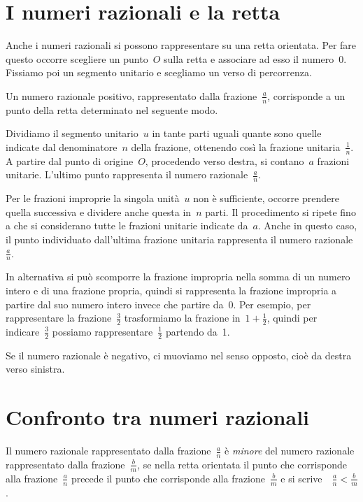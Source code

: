 \section{I numeri razionali e la retta}

Anche i numeri razionali si possono rappresentare su una retta orientata. Per fare questo occorre
scegliere un punto~$O$ sulla retta e associare ad esso il numero~0. Fissiamo poi un segmento unitario e scegliamo
un verso di percorrenza.

Un numero razionale positivo, rappresentato dalla frazione~$\frac{a}{n}$, corrisponde a un punto della retta determinato nel seguente modo.

Dividiamo il segmento unitario~$u$ in tante parti uguali
quante sono quelle indicate dal denominatore~$n$ della frazione, ottenendo così la frazione unitaria~$\frac{1}{n}$.
A partire dal punto di origine~$O$, procedendo verso destra, si contano~$a$ frazioni unitarie.
L'ultimo punto rappresenta il numero razionale~$\frac{a}{n}$.

Per le frazioni improprie la singola unità~$u$ non è sufficiente, occorre prendere quella successiva e
dividere anche questa in~$n$ parti. Il procedimento si ripete fino a che si considerano tutte
le frazioni unitarie indicate da~$a$. Anche in questo caso, il punto individuato dall'ultima frazione unitaria
rappresenta il numero razionale~$\frac{a}{n}$.

In alternativa si può scomporre la frazione impropria
nella somma di un numero intero e di una frazione propria, quindi si rappresenta la frazione impropria
a partire dal suo numero intero invece che partire da~0.
Per esempio, per rappresentare la frazione~$\frac{3}{2}$
trasformiamo la frazione in~$1+\frac{1}{2}$, quindi per indicare~$\frac{3}{2}$ possiamo rappresentare~$\frac{1}{2}$ partendo da~1.

Se il numero razionale è negativo, ci muoviamo nel senso opposto, cioè da destra verso sinistra.

\begin{center}

\end{center}

\ovalbox{\risolvii \ref{ese:3.33}, \ref{ese:3.34}, \ref{ese:3.35}}

\section{Confronto tra numeri razionali}

Il numero razionale rappresentato dalla frazione~$\frac{a}{n}$ è \emph{minore} del numero razionale
rappresentato dalla frazione~$\frac{b}{m}$, se nella retta orientata il punto che corrisponde alla
frazione~$\frac{a}{n}$ precede il punto che corrisponde alla frazione~$\frac{b}{m}$ e si scrive\ \  $\frac{a}{n}<\frac{b}{m}$.

